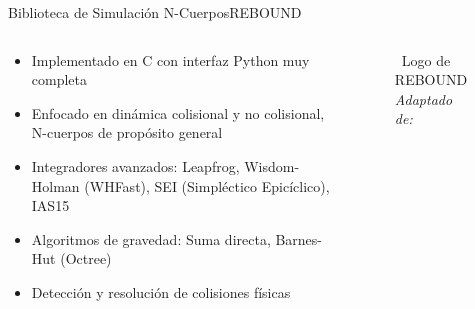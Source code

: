 \begin{frame}{Biblioteca de Simulación N-Cuerpos}{REBOUND}
    \begin{columns}
        \begin{column}{0.6\textwidth}
            \begin{itemize}
                \item Implementado en C con interfaz Python muy completa
                \item Enfocado en dinámica colisional y no colisional, N-cuerpos de propósito general
                \item Integradores avanzados: Leapfrog, Wisdom-Holman (WHFast), SEI (Simpléctico Epicíclico), IAS15
                \item Algoritmos de gravedad: Suma directa, Barnes-Hut (Octree)
                \item Detección y resolución de colisiones físicas
            \end{itemize}
        \end{column}
        \begin{column}{0.4\textwidth}
            \centering
            \begin{figure}[H]
                \centering
                \vspace{-0.25cm}
                \caption{\tiny~Logo de REBOUND \textit{Adaptado de:}~\cite{Rein2012}}%
                \label{fig:REBOUND_logo}
            \end{figure}
        \end{column}
    \end{columns}
\end{frame}

